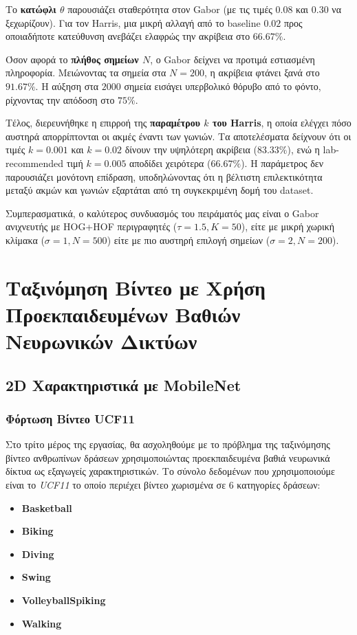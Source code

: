 \documentclass[12pt, a4paper]{article}
\begin{document}
Το \textbf{κατώφλι $\theta$} παρουσιάζει σταθερότητα στον Gabor (με τις τιμές $0.08$ και $0.30$ να ξεχωρίζουν). Για τον Harris, μια μικρή αλλαγή από το baseline $0.02$ προς οποιαδήποτε κατεύθυνση ανεβάζει ελαφρώς την ακρίβεια στο $66.67\%$. 

Όσον αφορά το \textbf{πλήθος σημείων $N$}, ο Gabor δείχνει να προτιμά εστιασμένη πληροφορία. Μειώνοντας τα σημεία στα $N{=}200$, η ακρίβεια φτάνει ξανά στο \textbf{$91.67\%$}. Η αύξηση στα $2000$ σημεία εισάγει υπερβολικό θόρυβο από το φόντο, ρίχνοντας την απόδοση στο $75\%$.

Τέλος, διερευνήθηκε η επιρροή της \textbf{παραμέτρου $k$ του Harris}, η οποία ελέγχει πόσο αυστηρά απορρίπτονται οι ακμές έναντι των γωνιών. Τα αποτελέσματα δείχνουν ότι οι τιμές $k{=}0.001$ και $k{=}0.02$ δίνουν την υψηλότερη ακρίβεια ($83.33\%$), ενώ η lab-recommended τιμή $k{=}0.005$ αποδίδει χειρότερα ($66.67\%$). Η παράμετρος δεν παρουσιάζει μονότονη επίδραση, υποδηλώνοντας ότι η βέλτιστη επιλεκτικότητα μεταξύ ακμών και γωνιών εξαρτάται από τη συγκεκριμένη δομή του dataset.

Συμπερασματικά, ο καλύτερος συνδυασμός του πειράματός μας είναι ο Gabor ανιχνευτής με HOG+HOF περιγραφητές ($\tau{=}1.5, K{=}50$), είτε με μικρή χωρική κλίμακα ($\sigma{=}1, N{=}500$) είτε με πιο αυστηρή επιλογή σημείων ($\sigma{=}2, N{=}200$).

\section{Ταξινόμηση Βίντεο με Χρήση Προεκπαιδευμένων Βαθιών Νευρωνικών Δικτύων}

\subsection{2D Χαρακτηριστικά με MobileNet}

\subsubsection{Φόρτωση Βίντεο UCF11}

Στο τρίτο μέρος της εργασίας, θα ασχοληθούμε με το πρόβλημα της ταξινόμησης βίντεο ανθρωπίνων δράσεων χρησιμοποιώντας προεκπαιδευμένα βαθιά νευρωνικά δίκτυα ως εξαγωγείς χαρακτηριστικών. Το σύνολο δεδομένων που χρησιμοποιούμε είναι το \textit{UCF11} το οποίο περιέχει  βίντεο χωρισμένα σε 6 κατηγορίες δράσεων:
\begin{itemize}
    \item \textbf{Basketball}
    \item \textbf{Biking}
    \item \textbf{Diving}
    \item \textbf{Swing}
    \item \textbf{VolleyballSpiking}
    \item \textbf{Walking}
\end{itemize}
\end{document}
